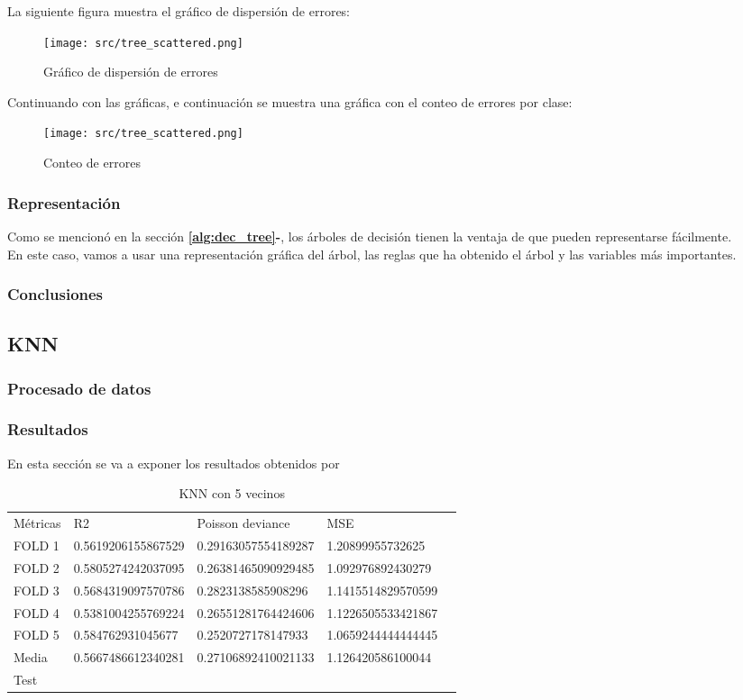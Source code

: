 La siguiente figura muestra el gráfico de dispersión de errores: 
 \begin{figure}[!htbp]
	\centering
	\texttt{[image: src/tree\_scattered.png]}
	\caption{Gráfico de dispersión de errores}
	\label{fig:tree_scattered}
\end{figure}
Continuando con las gráficas, e continuación se muestra una gráfica con el conteo de errores por clase:
 \begin{figure}[!htbp]
	\centering
	\texttt{[image: src/tree\_scattered.png]}
	\caption{Conteo de errores}
	\label{fig:tree_error_plot}
\end{figure}
\subsubsection{Representación}
Como se mencionó en la sección \textbf{\ref{alg:dec_tree}-}, los árboles de decisión tienen la ventaja de que pueden representarse fácilmente. \\
En este caso, vamos a usar una representación gráfica del árbol, las reglas que ha obtenido el árbol y las variables más importantes.

\subsubsection{Conclusiones}
\subsection{KNN}
\label{alg:knn}
\subsubsection{Procesado de datos}
\subsubsection{Resultados}
En esta sección se va a exponer los resultados obtenidos por 
\begin{table}[htbp]
    \begin{tabular}{|l|l|l|l|l}
    \cline{1-4}
    Métricas & R2                 & Poisson deviance     & MSE                 \\ \cline{1-4}
    FOLD 1   & 0.5619206155867529 & 0.29163057554189287  & 1.20899955732625    \\ \cline{1-4}
    FOLD 2   & 0.5805274242037095 & 0.26381465090929485  & 1.092976892430279   \\ \cline{1-4}
    FOLD 3   & 0.5684319097570786 & 0.2823138585908296   & 1.1415514829570599  \\ \cline{1-4}
    FOLD 4   & 0.5381004255769224 &  0.26551281764424606 & 1.1226505533421867  \\ \cline{1-4}
    FOLD 5   & 0.584762931045677  & 0.2520727178147933   & 1.0659244444444445  \\ \cline{1-4}
    Media    & 0.5667486612340281 & 0.27106892410021133  & 1.126420586100044   \\ \cline{1-4}
    Test & & & \\ \cline{1-4}
   \end{tabular}
	\caption{KNN con 5 vecinos}
\end{table}
